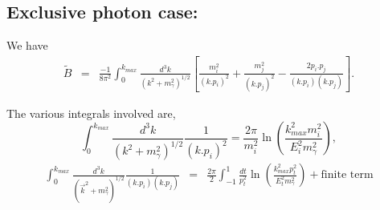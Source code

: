 \documentclass[a4paper,11pt]{article}
\begin{document}
		\subsection{Exclusive photon case:}
		We have
		\begin{eqnarray}
		\tilde{B}&=& \frac{-1}{8\pi^{2}}\int_{0}^{k_{max}}\frac{d^{3}k}{(k^{2}+m_{\gamma}^{2})^{1/2}}\left[\frac{m_{i}^{2}}{(k.p_{i})^{2}}+\frac{m_{j}^{2}}{(k.p_{j})^{2}}-\frac{2p_{i}.p_{j}}{(k.p_{i})(k.p_{j})}\right].  
		\end{eqnarray}
		
		The various integrals involved are,
		\begin{equation}
		\int_{0}^{k_{max}}\frac{d^{3}k}{(k^{2}+m_{\gamma}^{2})^{1/2}}\frac{1}{(k.p_{i})^{2}}=\frac{2\pi}{m_{i}^{2}}\ln\left( \frac{k_{max}^{2}m_{i}^{2}}{E_{i}^{2}m_{\gamma}^{2}}\right), 
		\end{equation}
		\begin{eqnarray}
		\int_{0}^{k_{max}}\frac{d^{3}k}{(\vec{k}^{2}+m_{\gamma}^{2})^{1/2}}\frac{1}{(k.p_{i})(k.p_{j})}&=& \frac{2\pi}{2}\int_{-1}^{1}\frac{dt}{p_{t}^{2}}\ln\left( \frac{k_{max}^{2}p_{t}^{2}}{E_{t}^{2}m_{\gamma}^{2}}\right) + \text{finite term} 
		\end{eqnarray}
		
\end{document}

